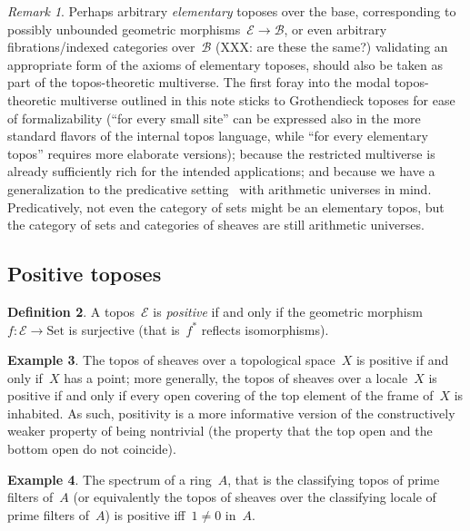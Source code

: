 \documentclass[oneside,reqno]{amsart}
\theoremstyle{definition}
\newtheorem{defn}{Definition}[section]
\newtheorem{ex}[defn]{Example}
\theoremstyle{plain}
\theoremstyle{remark}
\newtheorem{rem}[defn]{Remark}
\newcommand{\E}{\mathcal{E}}
\newcommand{\B}{\mathcal{B}}
\newcommand{\Set}{\mathrm{Set}}
\renewcommand{\_}{\mathpunct{.}\,}
\newcommand{\?}{\,{:}\,}
\begin{document}
\begin{rem}Perhaps arbitrary \emph{elementary} toposes over the base, corresponding to
possibly unbounded geometric morphisms~$\E \to \B$, or even arbitrary
fibrations/indexed categories over~$\B$ (XXX: are these the same?) validating an appropriate form of the
axioms of elementary toposes, should also be
taken as part of the topos-theoretic multiverse. The first foray into the
modal topos-theoretic multiverse outlined in this note
sticks to Grothendieck toposes for ease of
formalizability (``for every small site'' can be expressed also in the more
standard flavors of the internal topos language, while ``for every elementary
topos'' requires more elaborate versions); because the restricted multiverse
is already sufficiently rich for the intended applications; and because we have
a generalization to the predicative setting~\cite{crosilla:xxx} with arithmetic
universes in mind. Predicatively, not even the category of sets might be an
elementary topos, but the category of sets and categories of sheaves are still
arithmetic universes.
\end{rem}


\subsection{Positive toposes}

\begin{defn}A topos~$\E$ is \emph{positive} if and only if the geometric
morphism~$f : \E \to \Set$ is surjective (that is~$f^*$ reflects
isomorphisms).\end{defn}

\begin{ex}The topos of sheaves over a topological space~$X$ is positive if and
only if~$X$ has a point; more generally, the topos of sheaves over a locale~$X$
is positive if and only if every open covering of the top element of the frame
of~$X$ is inhabited. As such, positivity is a more informative
version of the constructively weaker property of being nontrivial (the property that the top open
and the bottom open do not coincide).\end{ex}

\begin{ex}The spectrum of a ring~$A$, that is the classifying topos of prime
filters of~$A$ (or equivalently the topos of sheaves over the classifying
locale of prime filters of~$A$) is positive iff~$1 \neq 0$ in~$A$.\end{ex}
\end{document}
